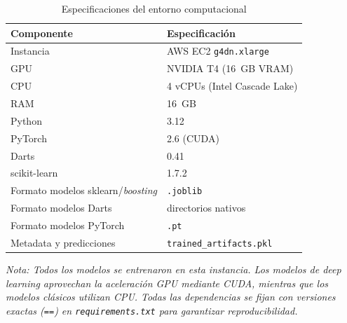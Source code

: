 \begin{table}[H]
\centering
\caption{Especificaciones del entorno computacional}
\label{tab:computational_env}
\small
\begin{tabular}{@{}lp{10cm}@{}}
\toprule
\textbf{Componente} & \textbf{Especificaci\'on} \\
\midrule
Instancia & AWS EC2 \texttt{g4dn.xlarge} \\
GPU & NVIDIA T4 (16~GB VRAM) \\
CPU & 4 vCPUs (Intel Cascade Lake) \\
RAM & 16~GB \\
\midrule
Python & 3.12 \\
PyTorch & 2.6 (CUDA) \\
Darts & 0.41 \\
scikit-learn & 1.7.2 \\
\midrule
Formato modelos sklearn/\textit{boosting} & \texttt{.joblib} \\
Formato modelos Darts & directorios nativos \\
Formato modelos PyTorch & \texttt{.pt} \\
Metadata y predicciones & \texttt{trained\_artifacts.pkl} \\
\bottomrule
\end{tabular}
\vspace{0.2cm}
\parbox{0.9\textwidth}{\footnotesize\textit{Nota: Todos los modelos se entrenaron en esta instancia. Los modelos de \textit{deep learning} aprovechan la aceleraci\'on GPU mediante CUDA, mientras que los modelos cl\'asicos utilizan CPU. Todas las dependencias se fijan con versiones exactas (\texttt{==}) en \texttt{requirements.txt} para garantizar reproducibilidad.}}
\end{table}

